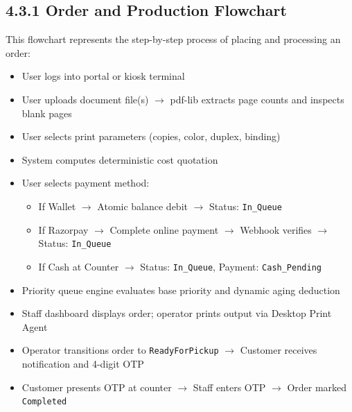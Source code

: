 \documentclass[12pt,a4paper]{report}
\begin{document}
\subsection{4.3.1 Order and Production Flowchart}
This flowchart represents the step-by-step process of placing and processing an order:
\begin{itemize}[leftmargin=0.35in, itemsep=2pt]
  \item User logs into portal or kiosk terminal
  \item User uploads document file(s) $\rightarrow$ pdf-lib extracts page counts and inspects blank pages
  \item User selects print parameters (copies, color, duplex, binding)
  \item System computes deterministic cost quotation
  \item User selects payment method:
    \begin{itemize}
      \item If Wallet $\rightarrow$ Atomic balance debit $\rightarrow$ Status: \texttt{In\_Queue}
      \item If Razorpay $\rightarrow$ Complete online payment $\rightarrow$ Webhook verifies $\rightarrow$ Status: \texttt{In\_Queue}
      \item If Cash at Counter $\rightarrow$ Status: \texttt{In\_Queue}, Payment: \texttt{Cash\_Pending}
    \end{itemize}
  \item Priority queue engine evaluates base priority and dynamic aging deduction
  \item Staff dashboard displays order; operator prints output via Desktop Print Agent
  \item Operator transitions order to \texttt{ReadyForPickup} $\rightarrow$ Customer receives notification and 4-digit OTP
  \item Customer presents OTP at counter $\rightarrow$ Staff enters OTP $\rightarrow$ Order marked \texttt{Completed}
\end{itemize}
\end{document}
